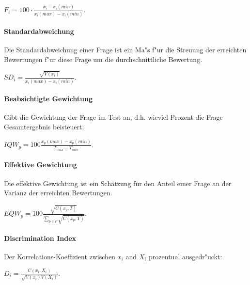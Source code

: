 \documentclass[12pt]{report}
\begin{document}
$F_i = 100\cdot\frac{\bar{x}_i - x_i(min)}{x_i(max) - x_i(min)}$. 

\paragraph{Standardabweichung}
Die Standardabweichung einer Frage ist ein Ma"s f"ur die Streuung der erreichten Bewertungen f"ur diese Frage um die durchschnittliche Bewertung. 

$SD_i = \frac{\sqrt{V(x_i)}}{x_i(max) - x_i(min)}$.

\paragraph{Beabsichtigte Gewichtung}
Gibt die Gewichtung der Frage im Test an, d.h. wieviel Prozent die Frage Gesamtergebnis beisteuert:

$IQW_p = 100\frac{x_p(max) - x_p(min)}{T_{max} - T_{min}}$.\\

\paragraph{Effektive Gewichtung}

Die effektive Gewichtung ist ein Schätzung für den Anteil einer Frage an der Varianz der erreichten Bewertungen.

$EQW_p = 100\frac{\sqrt{C(x_p, T)}}{\sum_{p \in P}\sqrt{C(x_p, T)}}.$\\

\paragraph{Discrimination Index}
Der Korrelations-Koeffizient zwischen $x_i$ and $X_i$ prozentual ausgedr"uckt:

$D_i= \frac{C(x_i, X_i)}{\sqrt{V(x_i)V(X_i)}}$.


\ \\

\end{document}

